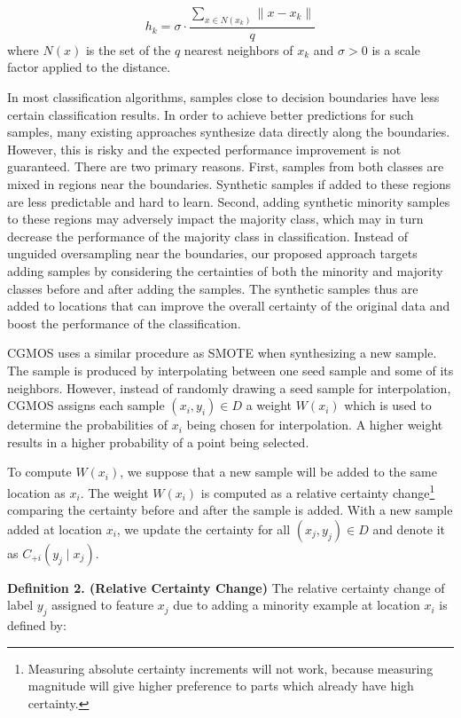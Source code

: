 \documentclass{iitthesis}
\begin{document}
\begin{equation}
h_k = \sigma \cdot \frac{\sum_{x \in N(x_k)} \| x-x_k \|}{q}
\end{equation}
where $N(x)$ is the set of the $q$ nearest neighbors of $x_k$ and $\sigma > 0$ is a scale factor applied to the distance. 

 In most classification algorithms, samples close to decision boundaries have less certain classification results. In order to achieve better predictions for such samples, many existing approaches synthesize data directly along the boundaries. However, this is risky and the expected performance improvement is not guaranteed. There are two primary reasons. First, samples from both classes are mixed in regions near the boundaries. Synthetic samples if added to  these regions are less predictable and hard to learn. Second, adding synthetic minority samples to these regions may adversely impact the majority class, which may in turn decrease the performance of the majority class in classification. Instead of unguided oversampling near the boundaries, our proposed approach targets adding samples by considering the certainties of both the minority and majority classes before and after adding the samples. The synthetic samples thus are added to locations that can improve the overall certainty of the original data and boost the performance of the classification.

CGMOS uses a similar procedure as SMOTE when synthesizing a new sample. The sample is produced by interpolating between one seed sample and some of its neighbors. However, instead of randomly drawing a seed sample for interpolation, CGMOS assigns each sample $(x_i, y_i) \in D$ a weight $W(x_i)$ which is used to determine the probabilities of $x_i$ being chosen for interpolation. A higher weight results in a higher probability of a point being selected.


To compute $W(x_i)$, we suppose that a new sample will be added to the same location as $x_i$. The weight $W(x_i)$ is computed as a relative certainty change\footnote{Measuring absolute certainty increments will not work, because measuring magnitude will give higher preference to parts which already have high certainty.} comparing the certainty before and after the sample is added. With a new sample added at location $x_i$, we update the certainty for all $(x_j, y_j) \in D$ and denote it as $C_{+i}(y_j \mid x_j)$. 

\noindent \textbf{Definition 2. (Relative Certainty Change)} The relative certainty change of label $y_j$ assigned to feature $x_j$ due to adding a minority example at location $x_i$ is defined by:
\end{document}
